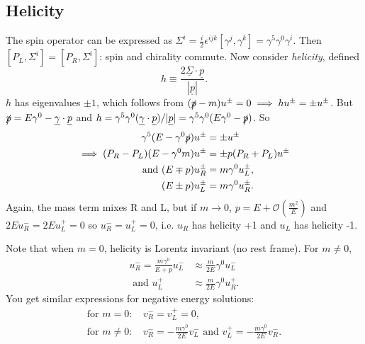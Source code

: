 \documentclass[a4paper,12pt]{article}
\begin{document}
\subsection{Helicity}
The spin operator can be expressed as $\Sigma^i = \frac{i}{2} \epsilon^{ijk}[\gamma^j, \gamma^k] = \gamma^5\gamma^0\gamma^i$. Then $[P_L, \Sigma^i] = [P_R, \Sigma^i]$: spin and chirality commute. Now consider \textit{helicity}, defined 
\begin{equation}
    h \equiv \frac{2\underline{\Sigma} \cdot \underline{p}}{|\underline{p}|}.
\end{equation}
$h$ has eigenvalues $\pm1$, which follows from $(\slashed{p} - m)u^\pm = 0 \implies hu^\pm = \pm u^\pm$. But $\slashed{p} = E\gamma^0 - \underline{\gamma}\cdot\underline{p}$ and $h = \gamma^5\gamma^0 (\underline{\gamma}\cdot\underline{p})/|\underline{p}| = \gamma^5\gamma^0(E\gamma^0 - \slashed{p})$. So
%
\begin{equation}
\begin{split}
\gamma^5(E - \gamma^0\slashed{p})u^\pm &= \pm u^\pm \\
\implies (P_R-P_L)(E-\gamma^0m)u^\pm &= \pm p(P_R + P_L)u^\pm \\
\text{ and } (E \mp p)u_R^\pm &= m\gamma^0 u_L^\pm, \\
             (E \pm p)u_L^\pm &= m\gamma^0 u_R^\pm. 
\end{split}
\end{equation}
Again, the mass term mixes R and L, but if $m \to 0$, $p = E + \mathcal{O}(\frac{m^2}{E})$ and $2E u_R^- = 2E u_L^+ = 0$ so $u_R^- = u_L^+ = 0$, i.e. $u_R$ has helicity +1 and $u_L$ has helicity -1. 

Note that when $m=0$, helicity is Lorentz invariant (no rest frame). For $m \neq 0$, 
\begin{equation}
\begin{split}
    u_R^- = \frac{m\gamma^0}{E+p}u_L^- &\approx \frac{m}{2E}\gamma^0u_L^- \\
    \text{ and } u_L^+ &\approx \frac{m}{2E}\gamma^0u_R^+.
\end{split}
\end{equation}
You get similar expressions for negative energy solutions:
\begin{equation}
\begin{split}
\text{for $m = 0$:   } &v_R^- = v_L^+ = 0, \\
\text{for $m \neq 0$:    }  &v_R^- = -\frac{m\gamma^0}{2E}v_L^- \text{ and } v_L^+ = -\frac{m\gamma^0}{2E}v_R^-.
\end{split}
\end{equation}
%
\end{document}
